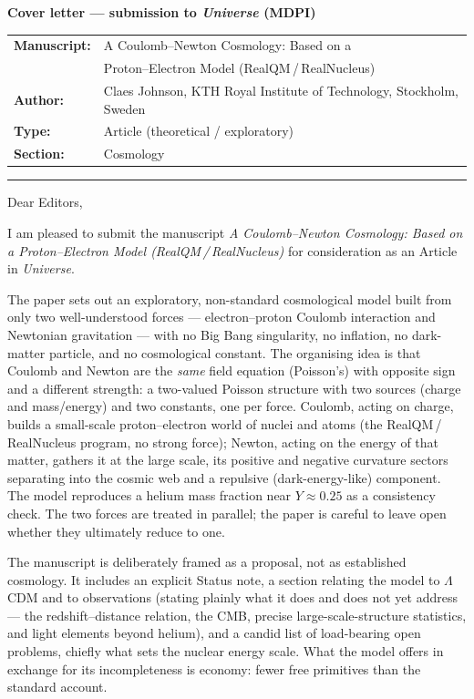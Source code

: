 \documentclass[11pt]{article}
\begin{document}
\noindent\textbf{\large Cover letter --- submission to \emph{Universe} (MDPI)}

\medskip
\noindent
\begin{tabular}{@{}ll@{}}
\textbf{Manuscript:} & A Coulomb--Newton Cosmology: Based on a \\
                     & Proton--Electron Model (RealQM\,/\,RealNucleus) \\
\textbf{Author:}     & Claes Johnson, KTH Royal Institute of Technology, Stockholm, Sweden \\
\textbf{Type:}       & Article (theoretical / exploratory) \\
\textbf{Section:}    & Cosmology \\
\end{tabular}

\bigskip
\hrule
\bigskip

\noindent Dear Editors,

\medskip
I am pleased to submit the manuscript \emph{A Coulomb--Newton Cosmology: Based on a Proton--Electron Model
(RealQM\,/\,RealNucleus)} for consideration as an Article in \emph{Universe}.

The paper sets out an exploratory, non-standard cosmological model built from only two well-understood forces ---
electron--proton Coulomb interaction and Newtonian gravitation --- with no Big Bang singularity, no inflation, no
dark-matter particle, and no cosmological constant. The organising idea is that Coulomb and Newton are the
\emph{same} field equation (Poisson's) with opposite sign and a different strength: a two-valued Poisson structure
with two sources (charge and mass/energy) and two constants, one per force. Coulomb, acting on charge, builds a
small-scale proton--electron world of nuclei and atoms (the RealQM\,/\,RealNucleus program, no strong force);
Newton, acting on the energy of that matter, gathers it at the large scale, its positive and negative curvature
sectors separating into the cosmic web and a repulsive (dark-energy-like) component. The model reproduces a helium
mass fraction near $Y\approx0.25$ as a consistency check. The two forces are treated in parallel; the paper is
careful to leave open whether they ultimately reduce to one.

The manuscript is deliberately framed as a proposal, not as established cosmology. It includes an explicit
Status note, a section relating the model to $\Lambda$CDM and to observations (stating plainly what it does and
does not yet address --- the redshift--distance relation, the CMB, precise large-scale-structure statistics, and
light elements beyond helium), and a candid list of load-bearing open problems, chiefly what sets the nuclear
energy scale. What the model offers in exchange for its incompleteness is economy: fewer free primitives than the
standard account.
\end{document}
